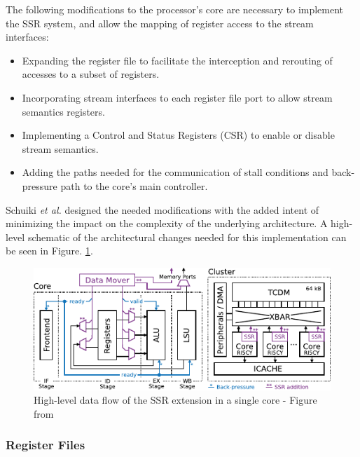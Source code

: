 The following modifications to the processor's core are necessary to implement the SSR system, and allow the mapping of register access to the stream interfaces:

\begin{itemize}
\item[]  Expanding the register file to facilitate the interception and rerouting of accesses to a subset of registers.
\item[]  Incorporating stream interfaces to each register file port to allow stream semantics registers.
\item[]  Implementing a Control and Status Registers (CSR) to enable or disable stream semantics.
\item[]  Adding the paths needed for the communication of stall conditions and back-pressure path to the core's main controller.
\end{itemize}

Schuiki \textit{et al.} \cite{9068465} designed the needed modifications with the added intent of minimizing the impact on the complexity of the underlying architecture. A high-level schematic of the architectural changes needed for this implementation can be seen in Figure. \ref{fig:ssr-overview}.

\begin{figure}[H]
	\begin{center}
 		\includegraphics[width=0.87\linewidth]{images/ssr-overview.pdf}
 		\caption{High-level data flow of the SSR extension in a single core  - Figure from \cite{9068465}}
 		\label{fig:ssr-overview}
	\end{center} 
\end{figure}

\subsubsection{Register Files}


